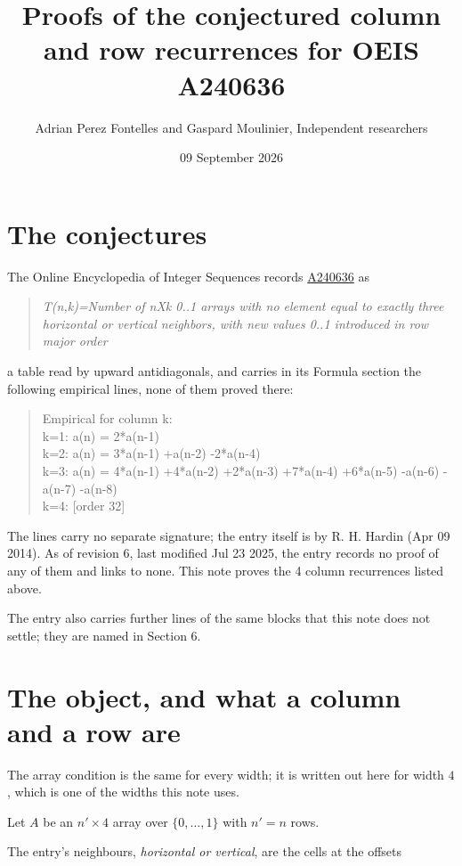 \documentclass[11pt]{article}
\title{Proofs of the conjectured column and row recurrences for OEIS A240636}
\author{Adrian Perez Fontelles and Gaspard Moulinier, Independent researchers}
\date{09 September 2026}
\theoremstyle{definition}
\begin{document}
\maketitle
\section{The conjectures}

The Online Encyclopedia of Integer Sequences records \href{https://oeis.org/A240636}{A240636} as

\begin{quote}\itshape T(n,k)=Number of nXk 0..1 arrays with no element equal to exactly three horizontal or vertical neighbors, with new values 0..1 introduced in row major order\end{quote}

a table read by upward antidiagonals, and carries in its Formula section the following empirical lines, none of them proved there:

\begin{quote}\ttfamily Empirical for column k:\\
k=1: a(n) = 2*a(n-1)\\k=2: a(n) = 3*a(n-1) +a(n-2) -2*a(n-4)\\k=3: a(n) = 4*a(n-1) +4*a(n-2) +2*a(n-3) +7*a(n-4) +6*a(n-5) -a(n-6) -a(n-7) -a(n-8)\\k=4: [order 32]\end{quote}

The lines carry no separate signature; the entry itself is by R. H. Hardin (Apr 09 2014). As of revision 6, last modified Jul 23 2025, the entry records no proof of any of them and links to none. This note proves the 4 column recurrences listed above.

The entry also carries further lines of the same blocks that this note does not settle; they are named in Section 6.

\section{The object, and what a column and a row are}

The array condition is the same for every width; it is written out here for width $4$, which is one of the widths this note uses.

Let $A$ be an $n' \times 4$ array over $\{0,\dots,1\}$ with $n' = n$ rows.

The entry's neighbours, {\itshape horizontal or vertical}, are the cells at the offsets
\end{document}
